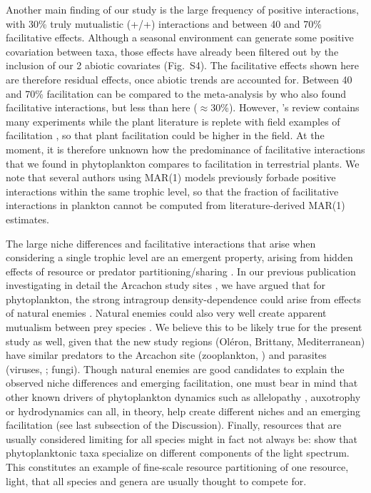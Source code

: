 \documentclass[10pt]{article}
\begin{document}
Another main finding of our study is the large frequency of positive
interactions, with 30\% truly mutualistic (+/+) interactions and between
40 and 70\% facilitative effects. Although a seasonal environment can generate some positive covariation between taxa, those effects have already been filtered out by the inclusion of our 2 abiotic covariates (Fig.~S4). The facilitative effects shown here are therefore residual effects, once abiotic trends are accounted for. Between 40 and 70\% facilitation can be compared to the
meta-analysis by \citet{adler_competition_2018} who also found facilitative
interactions, but less than here ($\approx$30\%). However, \citet{adler_competition_2018}'s
review contains many experiments while the plant literature is replete
with field examples of facilitation \citep{brooker_facilitation_2008,mcintire2014facilitation},
so that plant facilitation could be higher in the field. At the moment,
it is therefore unknown how the predominance of facilitative interactions
that we found in phytoplankton compares to facilitation in terrestrial
plants. We note that several authors using MAR(1) models previously
forbade positive interactions within the same trophic level, so that
the fraction of facilitative interactions in plankton cannot be computed
from literature-derived MAR(1) estimates.

The large niche differences and facilitative interactions that arise
when considering a single trophic level are an emergent property,
arising from hidden effects of resource or predator partitioning/sharing
\citep{chesson_updates_2018}. In our previous publication investigating
in detail the Arcachon study sites \citep{barraquand_coastal_2018},
we have argued that for phytoplankton, the strong intragroup density-dependence
could arise from effects of natural enemies \citep{haydon_pivotal_1994}.
Natural enemies could also very well create apparent mutualism between
prey species \citep{abrams_apparent_1998,barraquand_indirect_2015,de_ruiter_emergent_2017}.
We believe this to be likely true for the present study as well, given
that the new study regions (Oléron, Brittany, Mediterranean) have
similar predators to the Arcachon site (zooplankton, \citealp[e.g.,][]{jamet_zooplankton_2001,moderan_zooplankton_2010,tortajada_network_2012})
and parasites (viruses, \citealp[e.g.,][]{ory_pelagic_2010};
fungi). Though natural enemies are good candidates to explain the
observed niche differences and emerging facilitation, one must bear
in mind that other known drivers of phytoplankton dynamics such as
allelopathy \citep{felpeto_allelopathy_2018}, auxotrophy \citep{tang_most_2010}
or hydrodynamics \citep{levy_role_2018} can all, in theory, help
create different niches and an emerging facilitation (see last subsection
of the Discussion). Finally, resources that are usually considered
limiting for all species might in fact not always be: \citet{burson_competition_2018} show that phytoplanktonic taxa specialize on different components of the light spectrum. This constitutes an example of fine-scale resource partitioning of one resource,
light, that all species and genera are usually thought to compete for.
\end{document}
